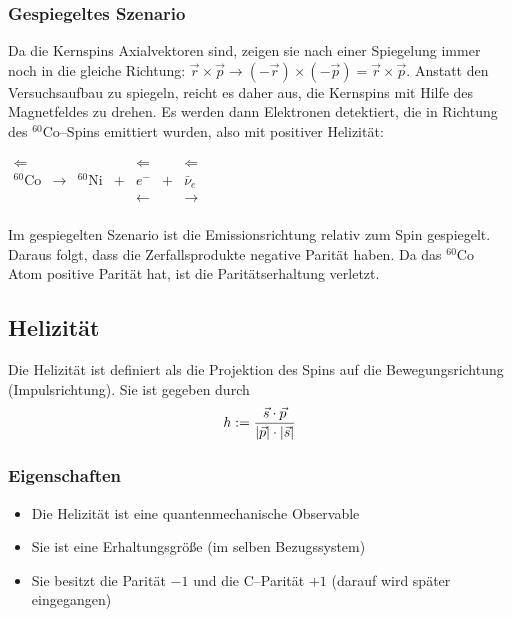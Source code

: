 \documentclass[Ex4_Zusammenfassung.tex]{subfiles}
\begin{document}
\subsubsection*{Gespiegeltes Szenario}
Da die Kernspins Axialvektoren sind, zeigen sie nach einer Spiegelung immer noch in die gleiche Richtung: $\vec r \times \vec p \rightarrow (-\vec r) \times (-\vec p) = \vec r \times \vec p $. Anstatt den Versuchsaufbau zu spiegeln, reicht es daher aus, die Kernspins mit Hilfe des Magnetfeldes zu drehen. Es werden dann Elektronen detektiert, die in Richtung des $^{60}\text{Co}$--Spins emittiert wurden, also 
mit positiver Helizität:
\begin{table}[h]
	\centering
	$
	\begin{array}{ccccccc}
		\Longleftarrow    &                 &                  &   & \Leftarrow     &   & \Leftarrow      \\
		{}^{60}\text{Co}        & \longrightarrow & {}^{60}\text{Ni} & + & e^-    & + & \bar{\nu}_e     \\
		&                 &                  &   & \longleftarrow &   & \longrightarrow \\
	\end{array}
	$
\end{table}

Im gespiegelten Szenario ist die Emissionsrichtung relativ zum Spin gespiegelt. Daraus folgt, dass die Zerfallsprodukte negative Parität haben. Da das ${}^{60}\text{Co}$ Atom positive Parität hat, ist die Paritätserhaltung verletzt.

\subsection{Helizität}
Die Helizität ist definiert als die Projektion des Spins auf die Bewegungsrichtung (Impulsrichtung). Sie ist gegeben durch
\begin{equation}
	h:=\frac{\vec{s}\cdot \vec{p}}{\left\vert \vec{p} \right\vert\cdot \left\vert \vec{s} \right\vert}
\end{equation}

\subsubsection{Eigenschaften}
\begin{itemize}
	\item Die Helizität ist eine quantenmechanische Observable
	\item Sie ist eine Erhaltungsgröße (im selben Bezugssystem)
	\item Sie besitzt die Parität $-1$ und die C--Parität $+1$ (darauf wird später eingegangen)
\end{itemize}
\end{document}
